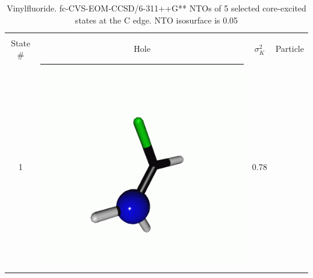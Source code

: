 \documentclass[journal=jctcce,manuscript=article]{achemso}
\begin{document}
 \begin{table}[H]
 \centering
 \caption{Vinylfluoride. fc-CVS-EOM-CCSD/6-311++G** 
 NTOs of 5 selected core-excited states at the C edge. 
 NTO isosurface is 0.05\label{vinylfluoride-ntos-Cedge}}
 \vspace{3em}
 \begin{tabular}{ c | c c c }
     \hline
             & \multicolumn{3}{c}{} \\
     State \# &  Hole & $\sigma_K^2$ & Particle \\
     \hline
     1 &  
     \begin{minipage}{0.2\textwidth}
         \centering
         \includegraphics[scale=0.10]{NTO/CH2CHF/1h.png}
     \end{minipage}
     & 0.78
     &  \begin{minipage}{0.2\textwidth}
         \centering

\end{minipage}
\end{tabular}
\end{table}
\end{document}
